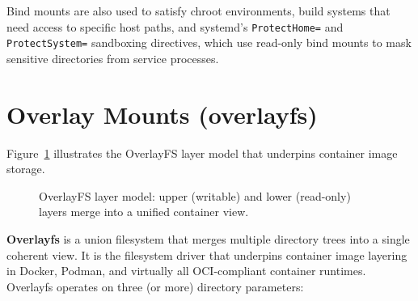 Bind mounts are also used to satisfy chroot environments, build systems that need access to specific host paths, and systemd's \texttt{ProtectHome=} and \texttt{ProtectSystem=} sandboxing directives, which use read-only bind mounts to mask sensitive directories from service processes.

\section{Overlay Mounts (overlayfs)}

Figure~\ref{fig:overlayfs} illustrates the OverlayFS layer model that underpins container image storage.

\begin{figure}[htbp]
\centering
{}
\caption{OverlayFS layer model: upper (writable) and lower (read-only) layers merge into a unified container view.}
\label{fig:overlayfs}
\end{figure}

\textbf{Overlayfs} is a union filesystem that merges multiple directory trees into a single coherent view. It is the filesystem driver that underpins container image layering in Docker, Podman, and virtually all OCI-compliant container runtimes. Overlayfs operates on three (or more) directory parameters:

